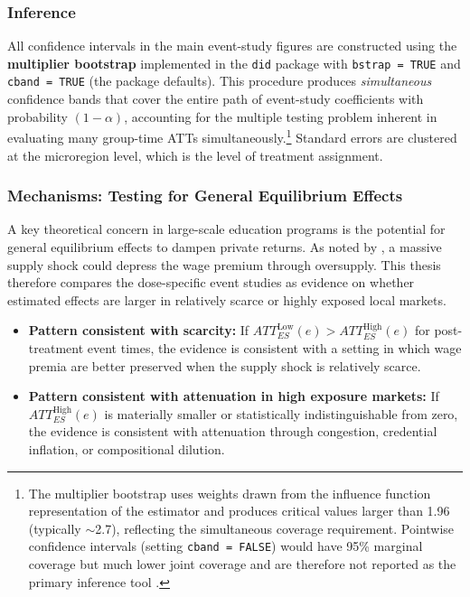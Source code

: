 \subsubsection{Inference}
\label{sec:inference}

All confidence intervals in the main event-study figures are constructed using the \textbf{multiplier bootstrap} implemented in the \texttt{did} package with \texttt{bstrap = TRUE} and \texttt{cband = TRUE} (the package defaults). This procedure produces \emph{simultaneous} confidence bands that cover the entire path of event-study coefficients with probability $(1 - \alpha)$, accounting for the multiple testing problem inherent in evaluating many group-time ATTs simultaneously.\footnote{The multiplier bootstrap uses weights drawn from the influence function representation of the estimator and produces critical values larger than 1.96 (typically $\sim$2.7), reflecting the simultaneous coverage requirement. Pointwise confidence intervals (setting \texttt{cband = FALSE}) would have 95\% marginal coverage but much lower joint coverage and are therefore not reported as the primary inference tool \cite{CallawaySantAnna2021}.} Standard errors are clustered at the microregion level, which is the level of treatment assignment.


\subsubsection{Mechanisms: Testing for General Equilibrium Effects}
\label{sec:mechanisms}

A key theoretical concern in large-scale education programs is the potential for general equilibrium effects to dampen private returns. As noted by , a massive supply shock could depress the wage premium through oversupply. This thesis therefore compares the dose-specific event studies as evidence on whether estimated effects are larger in relatively scarce or highly exposed local markets.
\begin{itemize}
    \item \textbf{Pattern consistent with scarcity:} If $ATT_{ES}^{\text{Low}}(e) > ATT_{ES}^{\text{High}}(e)$ for post-treatment event times, the evidence is consistent with a setting in which wage premia are better preserved when the supply shock is relatively scarce.
    \item \textbf{Pattern consistent with attenuation in high exposure markets:} If $ATT_{ES}^{\text{High}}(e)$ is materially smaller or statistically indistinguishable from zero, the evidence is consistent with attenuation through congestion, credential inflation, or compositional dilution.
\end{itemize}

